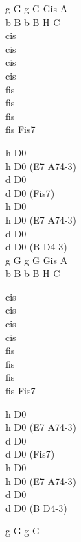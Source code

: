 \begin{chord}
    g G g G Gis A\\
    b B b B H C\\
    cis\\
    cis\\
    cis\\
    cis\\
    fis\\
    fis\\
    fis\\
    fis Fis7

    h D0\\
    h D0 (E7 A74-3)\\
    d D0\\
    d D0 (Fis7)\\
    h D0\\
    h D0 (E7 A74-3)\\
    d D0\\
    d D0 (B D4-3)\\
    g G g G Gis A\\
    b B b B H C

    cis\\
    cis\\
    cis\\
    cis\\
    fis\\
    fis\\
    fis\\
    fis Fis7

    h D0\\
    h D0 (E7 A74-3)\\
    d D0\\
    d D0 (Fis7)\\
    h D0\\
    h D0 (E7 A74-3)\\
    d D0\\
    d D0 (B D4-3)

    g G g G
\end{chord}